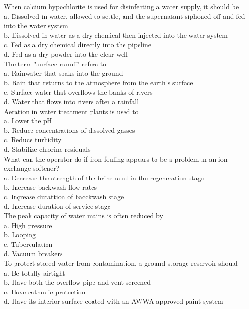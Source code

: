When calcium hypochlorite is used for disinfecting a water supply, it should be\\
a. Dissolved in water, allowed to settle, and the supernatant siphoned off and fed into the water system\\
b. Dissolved in water as a dry chemical then injected into the water system\\
c. Fed as a dry chemical directly into the pipeline\\
d. Fed as a dry powder into the clear well\\

The term "surface runoff" refers to\\
a. Rainwater that soaks into the ground\\
b. Rain that returns to the atmosphere from the earth's surface\\
c. Surface water that overflows the banks of rivers\\
d. Water that flows into rivers after a rainfall \\

Aeration in water treatment plants is used to\\
a. Lower the $\mathrm{pH}$\\
b. Reduce concentrations of dissolved gasses\\
c. Reduce turbidity\\
d. Stabilize chlorine residuals\\

What can the operator do if iron fouling appears to be a problem in an ion exchange softener?\\
a. Decrease the strength of the brine used in the regeneration stage\\
b. Increase backwash flow rates\\
c. Inçrease durattion of bacckwash stage\\
d. Increase duration of service stage\\

The peak capacity of water mains is often reduced by\\
a. High pressure\\
b. Looping\\
c. Tuberculation\\
d. Vacuum breakers\\

To protect stored water from contamination, a ground storage reservoir should\\
a. Be totally airtight\\
b. Have both the overflow pipe and vent screened\\
c. Have cathodic protection\\
d. Have its interior surface coated with an AWWA-approved paint system\\

